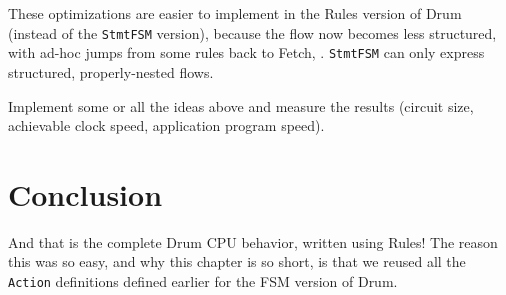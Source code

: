 These optimizations are easier to implement in the Rules version of
Drum (instead of the \verb|StmtFSM| version), because the flow now
becomes less structured, with ad-hoc jumps from some rules back to
Fetch, {\etc}.  \verb|StmtFSM| can only express structured,
properly-nested flows.

\hdivider

\Exercise

Implement some or all the ideas above and measure the results (circuit
size, achievable clock speed, application program speed).

\Endexercise


\section{Conclusion}

And that is the complete Drum CPU behavior, written using Rules!  The
reason this was so easy, and why this chapter is so short, is that we
reused all the \verb|Action| definitions defined earlier for the FSM
version of Drum.

